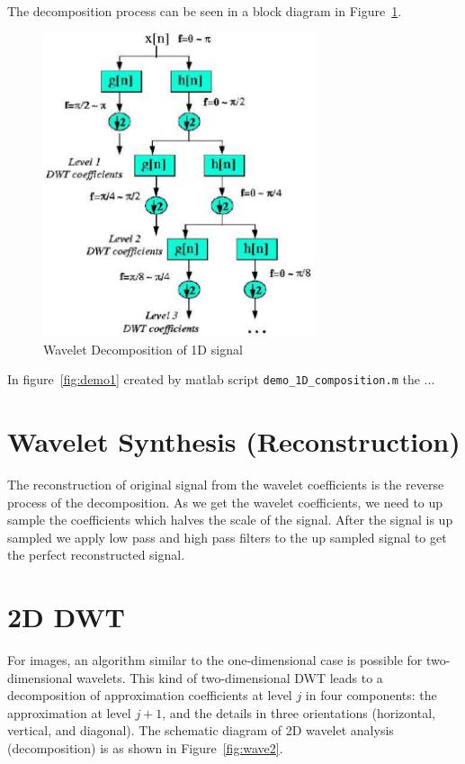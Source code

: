 \documentclass[a4paper,12pt]{article}
\begin{document}
The decomposition process can be seen in a block diagram in Figure~\ref{fig:wave1}.

\begin{figure}[t]
        \centering
        \includegraphics[width=8cm]{diagram.png}
        \caption{Wavelet Decomposition of 1D signal}
		\label{fig:wave1}
\end{figure}

In figure~\ref{fig:demo1} created by matlab script \texttt{demo\_1D\_composition.m} the ...




\section{Wavelet Synthesis (Reconstruction)}
The reconstruction of original signal from the wavelet coefficients is the reverse process of the decomposition. As we get the wavelet coefficients, we need to up sample the coefficients which halves the scale of the signal. After the signal is up sampled we apply low pass and high pass filters to the up sampled signal to get the perfect reconstructed signal.



\section{2D DWT}
For images, an algorithm similar to the one-dimensional case is possible for two-dimensional wavelets. This kind of two-dimensional DWT leads to a decomposition of approximation coefficients at level $j$ in four components: the approximation at level $j+1$, and the details in three orientations (horizontal, vertical, and diagonal). The schematic diagram of 2D wavelet analysis (decomposition) is as shown in Figure~\ref{fig:wave2}.
\end{document}
